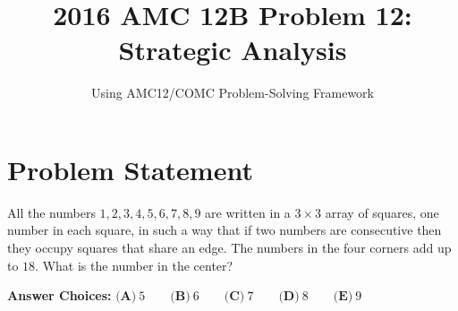 \documentclass[11pt]{article}
\title{\textbf{2016 AMC 12B Problem 12: Strategic Analysis}}
\author{Using AMC12/COMC Problem-Solving Framework}
\date{}
\begin{document}
\maketitle

\section*{Problem Statement}
All the numbers $1, 2, 3, 4, 5, 6, 7, 8, 9$ are written in a $3\times3$ array of squares, one number in each square, in such a way that if two numbers are consecutive then they occupy squares that share an edge. The numbers in the four corners add up to $18$. What is the number in the center?

\textbf{Answer Choices:} 
$\textbf{(A)}\ 5\qquad\textbf{(B)}\ 6\qquad\textbf{(C)}\ 7\qquad\textbf{(D)}\ 8\qquad\textbf{(E)}\ 9$
\end{document}
